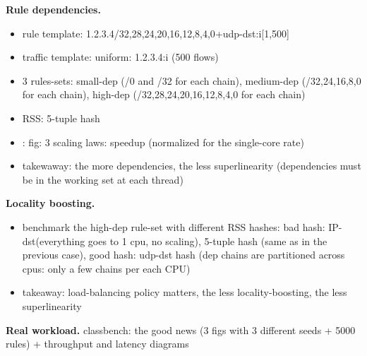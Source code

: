 \noindent%
\textbf{Rule dependencies.} %
\begin{itemize}
\item rule template: 1.2.3.4/{32,28,24,20,16,12,8,4,0}+udp-dst:i[1,500]
\item   traffic template: uniform: 1.2.3.4:i (500 flows) 
\item   3 rules-sets: small-dep (/0 and /32 for each chain), medium-dep (/{32,24,16,8,0}  for each chain), high-dep (/{32,28,24,20,16,12,8,4,0}  for each chain)
\item   RSS: 5-tuple hash
\item: fig: 3 scaling laws: speedup (normalized for the single-core rate)
\item takewaway: the more dependencies, the less superlinearity (dependencies must be in the working set at each thread)
\end{itemize}

\noindent%
\textbf{Locality boosting.} %
\begin{itemize}
\item benchmark the high-dep rule-set with different RSS hashes: bad hash: IP-dst(everything goes to 1 cpu, no scaling), 5-tuple hash (same as in the previous case), good hash: udp-dst hash (dep chains are partitioned across cpus: only a few chains per each CPU) 
\item  takeaway: load-balancing policy matters, the less locality-boosting, the less superlinearity
\end{itemize}

\noindent%
\textbf{Real workload.} %
classbench: the good news (3 figs with 3 different seeds + 5000 rules) + throughput and latency diagrams


